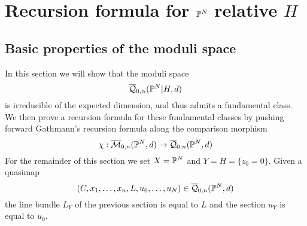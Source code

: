 \section{Recursion formula for $\mathbb P^N$ relative $H$} \label{Section recursion for PN}

\subsection{Basic properties of the moduli space} \label{Subsection basic properties of the moduli space}
In this section we will show that the moduli space
\begin{equation*} \overline{\mathcal Q}_{0,\alpha}(\mathbb P^N|H,d) \end{equation*}
is irreducible of the expected dimension, and thus admits a fundamental class. We then prove a recursion formula for these fundamental classes by pushing forward Gathmann's recursion formula along the comparison morphism
\begin{equation*}\chi : \overline{\mathcal M}_{0,n}(\mathbb P^N,d) \rightarrow \overline{\mathcal Q}_{0,n}(\mathbb P^N,d) \end{equation*}
For the remainder of this section we set $X=\mathbb P^N$ and $Y=H=\{ z_0 = 0 \}$. Given a quasimap
\begin{equation*} (C,x_1,\ldots,x_n,L,u_0,\ldots,u_N) \in \overline{\mathcal Q}_{0,n}(\mathbb P^N,d) \end{equation*}
the line bundle $L_Y$ of the previous section is equal to $L$ and the section $u_Y$ is equal to $u_0$.

